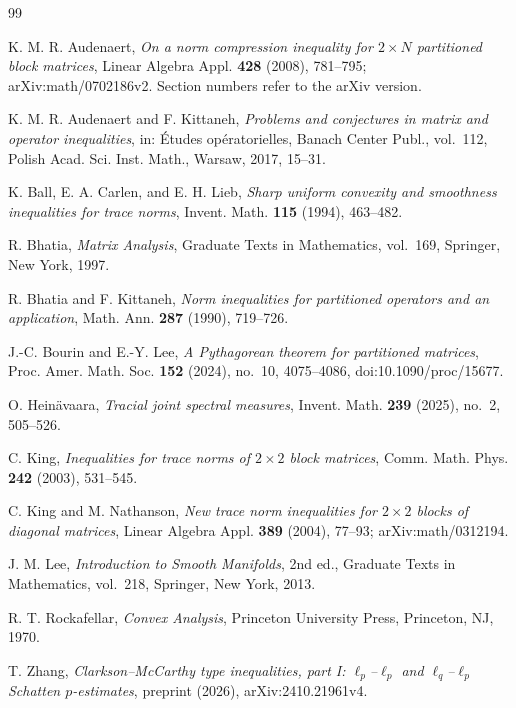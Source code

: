 \documentclass[11pt]{amsart}
\theoremstyle{definition}
\theoremstyle{remark}
\numberwithin{equation}{section}
\begin{document}
\begin{thebibliography}{99}

K. M. R. Audenaert, \emph{On a norm compression inequality for $2\times N$ partitioned block matrices}, Linear Algebra Appl. \textbf{428} (2008), 781--795; arXiv:math/0702186v2. Section numbers refer to the arXiv version.

K. M. R. Audenaert and F. Kittaneh, \emph{Problems and conjectures in matrix and operator inequalities}, in: \'Etudes op\'eratorielles, Banach Center Publ., vol.~112, Polish Acad. Sci. Inst. Math., Warsaw, 2017, 15--31.

K. Ball, E. A. Carlen, and E. H. Lieb, \emph{Sharp uniform convexity and smoothness inequalities for trace norms}, Invent. Math. \textbf{115} (1994), 463--482.

R. Bhatia, \emph{Matrix Analysis}, Graduate Texts in Mathematics, vol.~169, Springer, New York, 1997.

R. Bhatia and F. Kittaneh, \emph{Norm inequalities for partitioned operators and an application}, Math. Ann. \textbf{287} (1990), 719--726.

J.-C. Bourin and E.-Y. Lee, \emph{A Pythagorean theorem for partitioned matrices}, Proc. Amer. Math. Soc. \textbf{152} (2024), no.~10, 4075--4086, doi:10.1090/proc/15677.

O. Hein\"avaara, \emph{Tracial joint spectral measures}, Invent. Math. \textbf{239} (2025), no.~2, 505--526.

C. King, \emph{Inequalities for trace norms of $2\times2$ block matrices}, Comm. Math. Phys. \textbf{242} (2003), 531--545.

C. King and M. Nathanson, \emph{New trace norm inequalities for $2\times2$ blocks of diagonal matrices}, Linear Algebra Appl. \textbf{389} (2004), 77--93; arXiv:math/0312194.

J. M. Lee, \emph{Introduction to Smooth Manifolds}, 2nd ed., Graduate Texts in Mathematics, vol.~218, Springer, New York, 2013.

R. T. Rockafellar, \emph{Convex Analysis}, Princeton University Press, Princeton, NJ, 1970.

T. Zhang, \emph{Clarkson--McCarthy type inequalities, part I: $\ell_p$--$\ell_p$ and $\ell_q$--$\ell_p$ Schatten $p$-estimates}, preprint (2026), arXiv:2410.21961v4.

\end{thebibliography}
\end{document}
